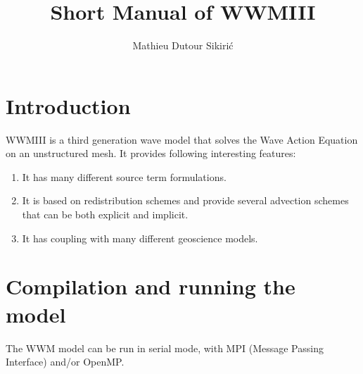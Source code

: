 \documentclass[12pt]{amsart}
\begin{document}
\author{Mathieu Dutour Sikiri\'c}
\address{Mathieu Dutour Sikiri\'c, Rudjer Boskovi\'c Institute, Bijenicka 54, 10000 Zagreb, Croatia}


\title{Short Manual of WWMIII}
\date{}

\maketitle


\section{Introduction}
WWMIII is a third generation wave model that solves the Wave Action Equation on an unstructured mesh.
It provides following interesting features:
\begin{enumerate}
\item It has many different source term formulations.
\item It is based on redistribution schemes and provide several advection
  schemes that can be both explicit and implicit.
\item It has coupling with many different geoscience models.
\end{enumerate}



\section{Compilation and running the model}

The WWM model can be run in serial mode, with MPI (Message Passing Interface) and/or OpenMP.
\end{document}
